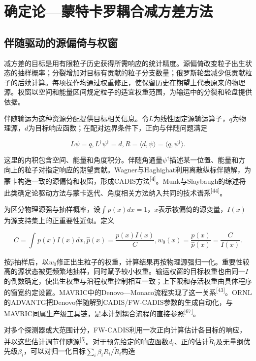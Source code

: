 \documentclass[UTF8, zihao=-4, fontset=none, a4paper]{ctexart}
\newcommand{\upcite}[1]{\textsuperscript{[#1]}}
\begin{document}
\section{确定论---蒙特卡罗耦合减方差方法}\label{sec:4}

\subsection{伴随驱动的源偏倚与权窗}

减方差的目标是用有限粒子历史获得所需响应的统计精度。源偏倚改变粒子出生状态的抽样概率；分裂增加对目标有贡献的粒子分支数量；俄罗斯轮盘减少低贡献粒子的后续计算。每项操作均通过权重修正，使保留历史在期望上代表原来的物理源。权窗以空间和能量区间规定粒子的适宜权重范围，为输运中的分裂和轮盘提供依据。

伴随输运为这种资源分配提供目标相关信息。令\(L\)为线性固定源输运算子，\(q\)为物理源，\(d\)为目标响应函数；在配对边界条件下，正向与伴随问题满足

\begin{equation}
L\psi = q,L^{\dagger}\psi^{\dagger} = d,R = \langle d,\psi\rangle = \langle q,\psi^{\dagger}\rangle.
\label{eq:5}
\end{equation}

这里的内积包含空间、能量和角度积分。伴随角通量\(\psi^{\dagger}\)描述某一位置、能量和方向上的粒子对指定响应的期望贡献。Wagner与Haghighat利用离散纵标伴随解，为蒙卡构造一致的源偏倚和权窗，形成CADIS方法\upcite{4}。Munk与Slaybaugh的综述将此类确定论驱动方法与蒙卡迭代、角度相关方法纳入共同的技术谱系\upcite{44}。

为区分物理源强与抽样概率，设\(\int_{}^{}{p(x)dx} = 1\)，\(x\)表示被偏倚的源变量，\(I(x)\)为源支持集上的正重要性近似。定义

\begin{equation}
C = \int_{}^{}{p(x)I(x)dx},\widehat{p}(x) = \frac{p(x)I(x)}{C},w_{0}(x) = \frac{p(x)}{\widehat{p}(x)} = \frac{C}{I(x)}.
\label{eq:6}
\end{equation}

按\(\widehat{p}\)抽样后，以\(w_{0}\)修正出生粒子的权重，计算结果再按物理源强归一化。重要性较高的源状态被更频繁地抽样，同时赋予较小权重。输运权窗的目标权重也由同一\(I\)的倒数确定，使出生权重与沿程权重控制相互一致；上下限和存活权重由具体程序的窗宽约定设置。MAVRIC中的Denovo---Monaco流程实现了这一关系\upcite{43}。ORNL的ADVANTG把Denovo伴随解到CADIS/FW-CADIS参数的生成自动化，与MAVRIC同属生产级工具链，是本计划耦合流程的直接参照\upcite{67}。

对多个探测器或大范围计分，FW-CADIS利用一次正向计算估计各目标的响应，并以这些估计调节伴随源\upcite{5}。对于预先给定的响应函数\(d_{i}\)、正的估计\({\widetilde{R}}_{i}\)及无量纲优先级\(\beta_{i}\)，可以对归一化目标\(\sum_{i}^{}{\beta_{i}R_{i}/{\widetilde{R}}_{i}}\)构造
\end{document}
